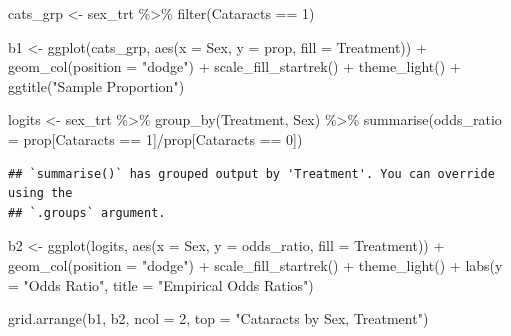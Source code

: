 \documentclass[
]{article}
\newenvironment{Shaded}{\begin{snugshade}}{\end{snugshade}}
\newcommand{\AttributeTok}[1]{\textcolor[rgb]{0.77,0.63,0.00}{#1}}
\newcommand{\DecValTok}[1]{\textcolor[rgb]{0.00,0.00,0.81}{#1}}
\newcommand{\FunctionTok}[1]{\textcolor[rgb]{0.00,0.00,0.00}{#1}}
\newcommand{\NormalTok}[1]{#1}
\newcommand{\OtherTok}[1]{\textcolor[rgb]{0.56,0.35,0.01}{#1}}
\newcommand{\SpecialCharTok}[1]{\textcolor[rgb]{0.00,0.00,0.00}{#1}}
\newcommand{\StringTok}[1]{\textcolor[rgb]{0.31,0.60,0.02}{#1}}
\begin{document}
\begin{Shaded}
\begin{Highlighting}[]
\NormalTok{cats\_grp }\OtherTok{\textless{}{-}}\NormalTok{ sex\_trt }\SpecialCharTok{\%\textgreater{}\%}
  \FunctionTok{filter}\NormalTok{(Cataracts }\SpecialCharTok{==} \DecValTok{1}\NormalTok{)}

\NormalTok{b1 }\OtherTok{\textless{}{-}} \FunctionTok{ggplot}\NormalTok{(cats\_grp, }\FunctionTok{aes}\NormalTok{(}\AttributeTok{x =}\NormalTok{ Sex, }\AttributeTok{y =}\NormalTok{ prop, }\AttributeTok{fill =}\NormalTok{ Treatment)) }\SpecialCharTok{+}
  \FunctionTok{geom\_col}\NormalTok{(}\AttributeTok{position =} \StringTok{"dodge"}\NormalTok{) }\SpecialCharTok{+}
  \FunctionTok{scale\_fill\_startrek}\NormalTok{() }\SpecialCharTok{+}
  \FunctionTok{theme\_light}\NormalTok{() }\SpecialCharTok{+}
  \FunctionTok{ggtitle}\NormalTok{(}\StringTok{"Sample Proportion"}\NormalTok{)}

\NormalTok{logits }\OtherTok{\textless{}{-}}\NormalTok{ sex\_trt }\SpecialCharTok{\%\textgreater{}\%}
  \FunctionTok{group\_by}\NormalTok{(Treatment, Sex) }\SpecialCharTok{\%\textgreater{}\%}
  \FunctionTok{summarise}\NormalTok{(}\AttributeTok{odds\_ratio =}\NormalTok{ prop[Cataracts }\SpecialCharTok{==} \DecValTok{1}\NormalTok{]}\SpecialCharTok{/}\NormalTok{prop[Cataracts }\SpecialCharTok{==} \DecValTok{0}\NormalTok{])}
\end{Highlighting}
\end{Shaded}

\begin{verbatim}
## `summarise()` has grouped output by 'Treatment'. You can override using the
## `.groups` argument.
\end{verbatim}

\begin{Shaded}
\begin{Highlighting}[]
\NormalTok{b2 }\OtherTok{\textless{}{-}} \FunctionTok{ggplot}\NormalTok{(logits, }\FunctionTok{aes}\NormalTok{(}\AttributeTok{x =}\NormalTok{ Sex, }\AttributeTok{y =}\NormalTok{ odds\_ratio, }\AttributeTok{fill =}\NormalTok{ Treatment)) }\SpecialCharTok{+}
  \FunctionTok{geom\_col}\NormalTok{(}\AttributeTok{position =} \StringTok{"dodge"}\NormalTok{) }\SpecialCharTok{+}
  \FunctionTok{scale\_fill\_startrek}\NormalTok{() }\SpecialCharTok{+}
  \FunctionTok{theme\_light}\NormalTok{() }\SpecialCharTok{+}
  \FunctionTok{labs}\NormalTok{(}\AttributeTok{y =} \StringTok{"Odds Ratio"}\NormalTok{,}
       \AttributeTok{title =} \StringTok{"Empirical Odds Ratios"}\NormalTok{)}

\FunctionTok{grid.arrange}\NormalTok{(b1, b2, }\AttributeTok{ncol =} \DecValTok{2}\NormalTok{, }\AttributeTok{top =} \StringTok{"Cataracts by Sex, Treatment"}\NormalTok{)}
\end{Highlighting}
\end{Shaded}
\end{document}
